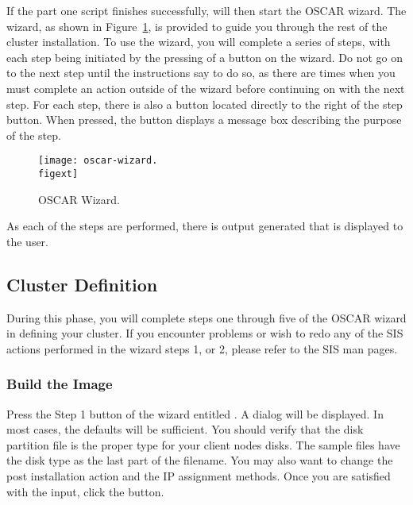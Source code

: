 If the part one script finishes successfully, 
will then start the OSCAR wizard. The wizard, as shown in
Figure~\ref{fig:detailed-oscar-wizard}, is provided to guide you
through the rest of the cluster installation.  To use the wizard, you
will complete a series of steps, with each step being initiated by the
pressing of a button on the wizard. Do not go on to the next step
until the instructions say to do so, as there are times when you must
complete an action outside of the wizard before continuing on with the
next step. For each step, there is also a  button located
directly to the right of the step button. When pressed, the
 button displays a message box describing the purpose of
the step.

\begin{figure}[htbp]
  \begin{center}
    \texttt{[image: oscar-wizard.\\figext]}
    \caption{OSCAR Wizard.}
    \label{fig:detailed-oscar-wizard}
  \end{center}
\end{figure}
  
As each of the steps are performed, there is output generated that is
displayed to the user. 


\subsection{Cluster Definition}
\label{sec:detailed-cluster-def}

During this phase, you will complete steps one through five of the
OSCAR wizard in defining your cluster. If you encounter problems or
wish to redo any of the SIS actions performed in the wizard steps 1,
or 2, please refer to the SIS man pages.

\subsubsection{Build the Image} 

Press the Step 1 button of the wizard entitled . A dialog will be displayed. In most cases, the defaults 
will be sufficient. You should verify that the disk partition file is
the proper type for your client nodes disks. The sample files have the
disk type as the last part of the filename. You may also want to change
the post installation action and the IP assignment methods.
Once you are satisfied with the input, click the  button.

